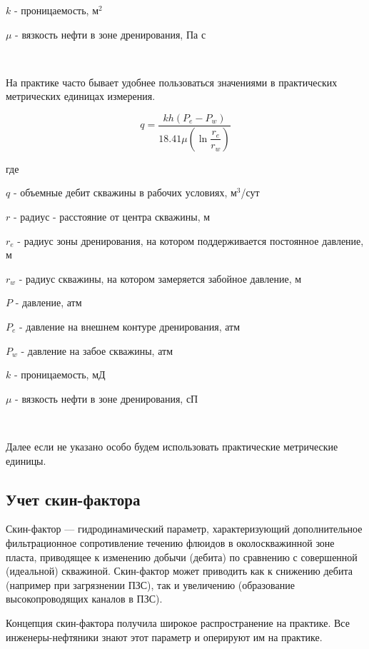 $k$ - проницаемость, м$^2$

$\mu$ - вязкость нефти в зоне дренирования, Па с

\

На практике часто бывает удобнее пользоваться значениями в практических метрических единицах измерения. 

\begin{equation} \label{eq:dupui_2}
q=\frac{kh\left(P_e-P_w\right)}{ 18.41 \mu\left(\ln{\dfrac{r_e}{r_w}}\right)}
\end{equation}

где 

$q$ - объемные дебит скважины в рабочих условиях, м$^3$/сут

$r$ -  радиус - расстояние от центра скважины, м

$r_e$ -  радиус зоны дренирования, на котором поддерживается постоянное давление, м

$r_w$ - радиус скважины, на котором замеряется забойное давление, м

$P$ - давление, атм

$P_e$ - давление на внешнем контуре дренирования, атм

$P_w$ - давление на забое скважины, атм

$k$ - проницаемость, мД

$\mu$ - вязкость нефти в зоне дренирования, сП

\

Далее если не указано особо будем использовать практические метрические единицы.

\subsection{Учет скин-фактора}

Скин-фактор — гидродинамический параметр, характеризующий дополнительное фильтрационное сопротивление течению флюидов в околоскважинной зоне пласта, приводящее к изменению добычи (дебита) по сравнению с совершенной (идеальной) скважиной. Скин-фактор может приводить как к снижению дебита (например при загрязнении ПЗС), так и увеличению (образование высокопроводящих каналов в ПЗС).

Концепция скин-фактора получила широкое распространение на практике. Все инженеры-нефтяники знают этот параметр и оперируют им на практике. 

